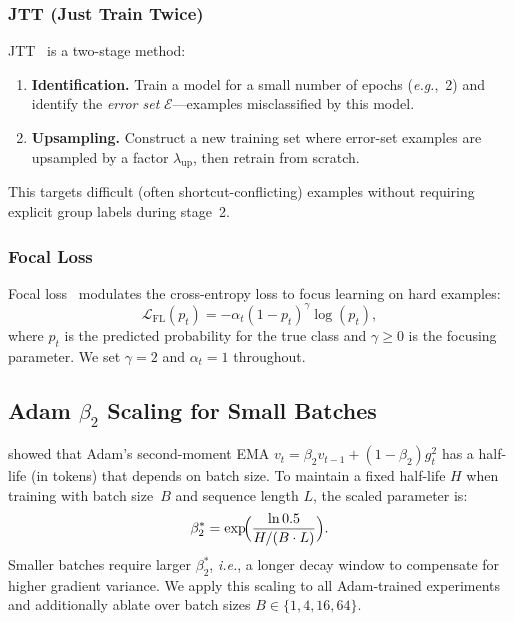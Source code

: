 \documentclass[10pt,twocolumn]{article}
\newcommand{\eg}{\emph{e.g.}\xspace}
\newcommand{\ie}{\emph{i.e.}\xspace}
\newcommand{\loss}{\mathcal{L}}
\begin{document}
\subsubsection{JTT (Just Train Twice)}
JTT~\citep{liu2021just} is a two-stage method:
\begin{enumerate}[leftmargin=*,itemsep=0pt]
\item \textbf{Identification.}  Train a model for a small
  number of epochs (\eg,~2) and identify the \emph{error set}
  $\mathcal{E}$---examples misclassified by this model.
\item \textbf{Upsampling.}  Construct a new training set where
  error-set examples are upsampled by a factor $\lambda_{\mathrm{up}}$, then retrain from scratch.
\end{enumerate}
This targets difficult (often shortcut-conflicting) examples
without requiring explicit group labels during stage~2.

\subsubsection{Focal Loss}
Focal loss~\citep{lin2017focal} modulates the cross-entropy
loss to focus learning on hard examples:
\begin{equation}
  \loss_{\mathrm{FL}}(p_t) = -\alpha_t (1 - p_t)^\gamma
  \log(p_t),
  \label{eq:focal}
\end{equation}
where $p_t$ is the predicted probability for the true class
and $\gamma \geq 0$ is the focusing parameter.  We set
$\gamma = 2$ and $\alpha_t = 1$ throughout.

\subsection{Adam $\beta_2$ Scaling for Small Batches}
\label{subsec:beta2}

\citet{marek2025scaling} showed that Adam's second-moment EMA
$v_t = \beta_2 v_{t-1} + (1 - \beta_2) g_t^2$
has a half-life (in tokens) that depends on batch size.
To maintain a fixed half-life $H$ when training with batch
size~$B$ and sequence length $L$, the scaled parameter is:
\begin{equation}
  \beta_2^* = \exp\!\Bigl(
    \frac{\ln 0.5}{H / (B \cdot L)}
  \Bigr).
  \label{eq:beta2}
\end{equation}
Smaller batches require larger $\beta_2^*$, \ie, a longer
decay window to compensate for higher gradient variance.
We apply this scaling to all Adam-trained experiments and
additionally ablate over batch sizes $B \in \{1, 4, 16, 64\}$.
\end{document}
